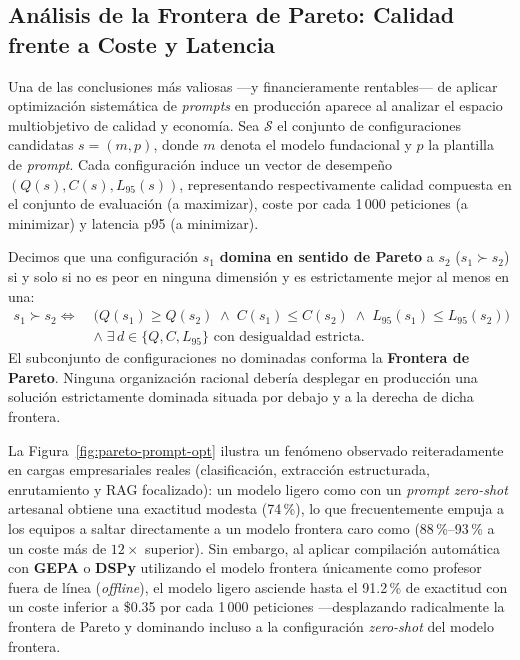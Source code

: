 \subsection{Análisis de la Frontera de Pareto: Calidad frente a Coste y Latencia}\label{subsec:frontera-pareto}

Una de las conclusiones más valiosas ---y financieramente rentables--- de aplicar optimización sistemática de \textit{prompts} en producción aparece al analizar el espacio multiobjetivo de calidad y economía. Sea $\mathcal{S}$ el conjunto de configuraciones candidatas $s = (m, p)$, donde $m$ denota el modelo fundacional y $p$ la plantilla de \textit{prompt}. Cada configuración induce un vector de desempeño $(Q(s), C(s), L_{95}(s))$, representando respectivamente calidad compuesta en el conjunto de evaluación (a maximizar), coste por cada 1\,000 peticiones (a minimizar) y latencia p95 (a minimizar).

Decimos que una configuración $s_1$ \textbf{domina en sentido de Pareto} a $s_2$ ($s_1 \succ s_2$) si y solo si no es peor en ninguna dimensión y es estrictamente mejor al menos en una:
\begin{equation}\label{eq:pareto-dominancia}
\begin{aligned}
  s_1 \succ s_2 \iff \;& \Big(Q(s_1) \ge Q(s_2) \;\wedge\; C(s_1) \le C(s_2) \;\wedge\; L_{95}(s_1) \le L_{95}(s_2)\Big) \\
  &\wedge\; \exists\, d \in \{Q, C, L_{95}\} \text{ con desigualdad estricta.}
\end{aligned}
\end{equation}
El subconjunto de configuraciones no dominadas conforma la \textbf{Frontera de Pareto}. Ninguna organización racional debería desplegar en producción una solución estrictamente dominada situada por debajo y a la derecha de dicha frontera.

La Figura~\ref{fig:pareto-prompt-opt} ilustra un fenómeno observado reiteradamente en cargas empresariales reales (clasificación, extracción estructurada, enrutamiento y RAG focalizado): un modelo ligero como  con un \textit{prompt} \textit{zero-shot} artesanal obtiene una exactitud modesta (74\,\%), lo que frecuentemente empuja a los equipos a saltar directamente a un modelo frontera caro como  (88\,\%--93\,\% a un coste más de $12\times$ superior). Sin embargo, al aplicar compilación automática con \textbf{GEPA} o \textbf{DSPy} utilizando el modelo frontera únicamente como profesor fuera de línea (\textit{offline}), el modelo ligero asciende hasta el 91.2\,\% de exactitud con un coste inferior a \$0.35 por cada 1\,000 peticiones ---desplazando radicalmente la frontera de Pareto y dominando incluso a la configuración \textit{zero-shot} del modelo frontera.

